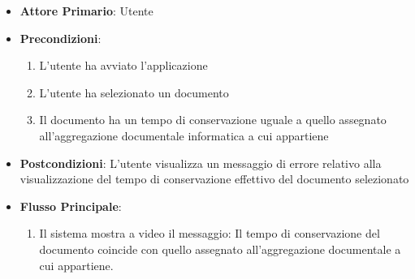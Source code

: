 \begin{itemize}
    \item \textbf{Attore Primario}: Utente
    \item \textbf{Precondizioni}:
    \begin{enumerate}
        \item L'utente ha avviato l'applicazione
        \item L'utente ha selezionato un documento
        \item Il documento ha un tempo di conservazione uguale a quello assegnato all'aggregazione documentale informatica a cui appartiene
    \end{enumerate}
    \item \textbf{Postcondizioni}: L'utente visualizza un messaggio di errore relativo alla visualizzazione del tempo di conservazione effettivo del documento selezionato
    \item \textbf{Flusso Principale}:
        \begin{enumerate}
            \item Il sistema mostra a video il messaggio: Il tempo di conservazione del documento coincide con quello assegnato all'aggregazione documentale a cui appartiene.
        \end{enumerate}
\end{itemize}

